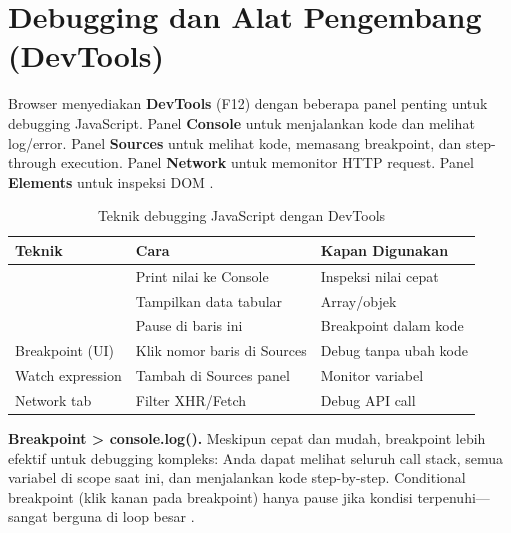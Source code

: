 \section{Debugging dan Alat Pengembang (DevTools)}

Browser menyediakan \textbf{DevTools} (F12) dengan beberapa panel penting untuk debugging JavaScript. Panel \textbf{Console} untuk menjalankan kode dan melihat log/error. Panel \textbf{Sources} untuk melihat kode, memasang breakpoint, dan step-through execution. Panel \textbf{Network} untuk memonitor HTTP request. Panel \textbf{Elements} untuk inspeksi DOM \cite{mdnToolsTesting}.

\begin{table}[htbp]
\centering
\begin{tabular}{|P{3cm}|P{4.5cm}|P{4.5cm}|}
\hline
\textbf{Teknik} & \textbf{Cara} & \textbf{Kapan Digunakan} \\
\hline
{} & Print nilai ke Console & Inspeksi nilai cepat \\
\hline
{} & Tampilkan data tabular & Array/objek \\
\hline
{} & Pause di baris ini & Breakpoint dalam kode \\
\hline
Breakpoint (UI) & Klik nomor baris di Sources & Debug tanpa ubah kode \\
\hline
Watch expression & Tambah di Sources panel & Monitor variabel \\
\hline
Network tab & Filter XHR/Fetch & Debug API call \\
\hline
\end{tabular}
\caption{Teknik debugging JavaScript dengan DevTools}
\end{table}

\begin{konsep}
\textbf{Breakpoint > console.log().} Meskipun  cepat dan mudah, breakpoint lebih efektif untuk debugging kompleks: Anda dapat melihat seluruh call stack, semua variabel di scope saat ini, dan menjalankan kode step-by-step. Conditional breakpoint (klik kanan pada breakpoint) hanya pause jika kondisi terpenuhi---sangat berguna di loop besar \cite{mdnToolsTesting}.
\end{konsep}

